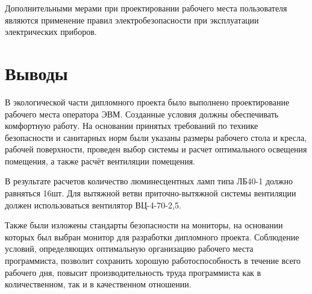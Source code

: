 Дополнительными мерами при проектировании рабочего места пользователя являются применение правил электробезопасности при эксплуатации электрических приборов.

\section{Выводы}
В экологической части дипломного проекта было выполнено проектирование рабочего места оператора ЭВМ. Созданные условия должны обеспечивать комфортную работу. На основании принятых требований по технике безопасности и санитарных норм были указаны размеры рабочего стола и кресла, рабочей поверхности, проведен выбор системы и расчет оптимального освещения помещения, а также расчёт вентиляции помещения.

В результате расчетов количество люминесцентных ламп типа ЛБ40-1 должно равняться 16шт. Для вытяжной ветви приточно-вытяжной системы вентиляции должен использоваться вентилятор ВЦ-4-70-2,5.

Также были изложены стандарты безопасности на мониторы, на основании которых был выбран монитор для разработки дипломного проекта. Соблюдение условий, определяющих оптимальную организацию рабочего места программиста, позволит сохранить хорошую работоспособность в течение всего рабочего дня, повысит производительность труда программиста как в количественном, так и в качественном отношении.
